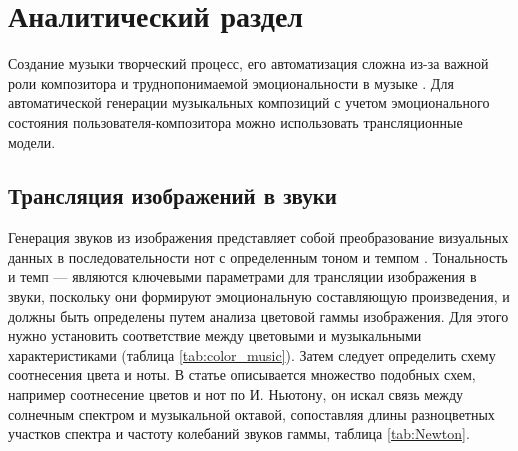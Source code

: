 \chapter{Аналитический раздел}

Создание музыки творческий процесс, его автоматизация сложна из-за важной роли композитора и труднопонимаемой эмоциональности в музыке \cite{big}. Для автоматической генерации музыкальных композиций с учетом эмоционального состояния пользователя-композитора можно использовать трансляционные модели\cite{web}.

\section{Трансляция изображений в звуки}
	Генерация звуков из изображения представляет собой преобразование визуальных данных в последовательности нот с определенным тоном и темпом \cite{alg}. Тональность и темп --- являются ключевыми параметрами для трансляции изображения в звуки, поскольку они формируют эмоциональную составляющую произведения, и должны быть определены путем анализа цветовой гаммы изображения. Для этого нужно установить соответствие между цветовыми и музыкальными характеристиками \cite{web} (таблица \ref{tab:color_music}). Затем следует определить схему соотнесения цвета и ноты\cite{web}. В статье \cite{colortonote} описывается множество подобных схем, например соотнесение цветов и нот по И. Ньютону, он искал связь между
	солнечным спектром и музыкальной октавой, сопоставляя длины разноцветных участков спектра и частоту колебаний звуков гаммы, таблица \ref{tab:Newton}.
	
